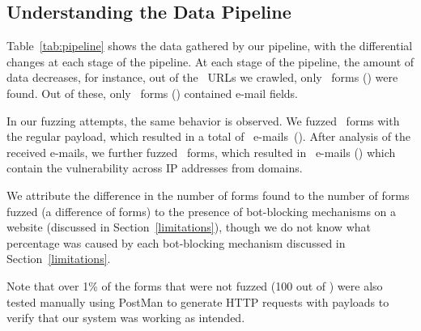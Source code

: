 \vspace{-3ex}
\subsection[The Pipeline]{Understanding the Data Pipeline}
\vspace{-2.5ex}
Table~\ref{tab:pipeline} shows the data gathered by our pipeline, with the differential changes at each stage of the pipeline. At each stage of the pipeline, the amount of data decreases, for instance, out of the \urls\ URLs we crawled, only \forms\ forms (\formsDelta) were found. Out of these, only \emailforms\ forms (\emailformsDelta) contained e-mail fields.

In our fuzzing attempts, the same behavior is observed. We fuzzed \fuzzed\ forms with the regular payload, which resulted in a total of \recd\ e-mails~(\recdDelta). After analysis of the received e-mails, we further fuzzed \malfuzzed\ forms, which resulted in \success\ e-mails (\successDelta) which contain the vulnerability across \ips IP addresses from \domains domains.

We attribute the difference in the number of forms found to the number of forms fuzzed (a difference of \diffFoundFuzz forms) to the presence of bot-blocking mechanisms on a website (discussed in Section~\ref{limitations}), though we do not know what percentage was caused by each bot-blocking mechanism discussed in Section~\ref{limitations}. 

Note that over 1\% of the forms that were not fuzzed (100 out of \diffFoundFuzz) were also tested manually using PostMan to generate HTTP requests with payloads to verify that our system was working as intended.




